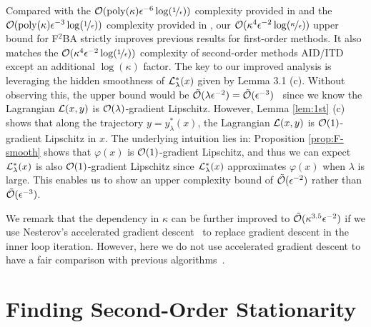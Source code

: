\documentclass{article}
\begin{document}
Compared with the ${\mathcal{O}}( {\rm poly}(\kappa) \epsilon^{-6} \log(\nicefrac{1}{\epsilon}))$ complexity provided in \cite{liu2022bome} and the ${\mathcal{O}}( {\rm poly}(\kappa) \epsilon^{-3} \log(\nicefrac{1}{\epsilon}))$ complexity provided in \cite{kwon2023fully}, our ${\mathcal{O}}(  \kappa^4 \epsilon^{-2} \log(\nicefrac{\kappa}{\epsilon}))$ upper bound for F${}^2$BA strictly improves previous results for first-order methods. It also matches the ${\mathcal{O}}(  \kappa^4 \epsilon^{-2} \log(\nicefrac{1}{\epsilon}))$ complexity of second-order methods AID/ITD~\cite{ji2021bilevel} except an additional $\log(\kappa)$ factor.  
The key to our improved analysis is 
leveraging the hidden smoothness of ${\mathcal{L}}_{\lambda}^*(x)$ given by Lemma 3.1 (c). 
Without observing this, the upper bound would be $\tilde {{\mathcal{O}}}(\lambda \epsilon^{-2}) = \tilde {{\mathcal{O}}}(\epsilon^{-3})$~\cite{kwon2023fully} since we know the Lagrangian ${\mathcal{L}}(x,y)$ is ${\mathcal{O}}(\lambda)$-gradient Lipschitz. However, Lemma \ref{lem:1st} (c) shows that along the trajectory $y = y_{\lambda}^*(x)$, the Lagrangian  ${\mathcal{L}}(x,y)$ is ${\mathcal{O}}(1)$-gradient Lipschitz in $x$.
The underlying intuition lies in: Proposition \ref{prop:F-smooth} shows that $\varphi(x)$ is ${\mathcal{O}}(1)$-gradient Lipschitz, and thus
we can expect ${\mathcal{L}}_{\lambda}^*(x)$ is also ${\mathcal{O}}(1)$-gradient Lipschitz since 
${\mathcal{L}}_{\lambda}^*(x)$ approximates $\varphi(x)$ when $\lambda$ is large. 
This enables us to show an upper complexity bound of $\tilde {{\mathcal{O}}}(\epsilon^{-2})$ rather than $\tilde {{\mathcal{O}}}(\epsilon^{-3})$.

We remark that the dependency in $\kappa$ can be further improved to $\tilde {{\mathcal{O}}}(\kappa^{3.5} \epsilon^{-2})$ if we use Nesterov's accelerated gradient descent~\cite{nesterov2018lectures} to replace gradient descent in the inner loop iteration. However, here we do not use accelerated gradient descent
to have a fair comparison with previous algorithms~\cite{kwon2023fully,ji2021bilevel,liu2022bome}.

\section{Finding Second-Order Stationarity} \label{sec:second}
\end{document}
